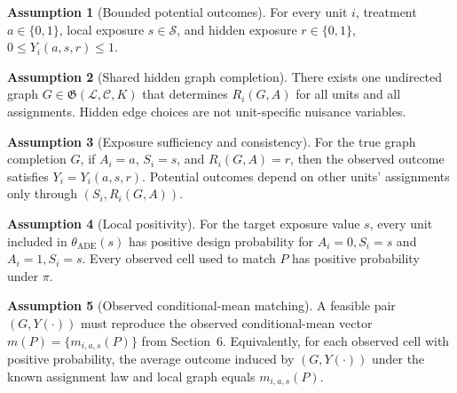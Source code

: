 \documentclass[11pt]{article}
\theoremstyle{definition}
\newtheorem{assumption}{Assumption}
\theoremstyle{plain}
\theoremstyle{remark}
\begin{document}
\begin{assumption}[Bounded potential outcomes]\label{ass:bounded}
For every unit \(i\), treatment \(a\in\{0,1\}\), local exposure \(s\in\mathcal S\), and hidden exposure \(r\in\{0,1\}\), \(0\le Y_i(a,s,r)\le1\).
\end{assumption}

\begin{assumption}[Shared hidden graph completion]\label{ass:shared-completion}
There exists one undirected graph \(G\in\mathfrak G(\mathcal L,\mathcal C,K)\) that determines \(R_i(G,A)\) for all units and all assignments.  Hidden edge choices are not unit-specific nuisance variables.
\end{assumption}

\begin{assumption}[Exposure sufficiency and consistency]\label{ass:exposure-consistency}
For the true graph completion \(G\), if \(A_i=a\), \(S_i=s\), and \(R_i(G,A)=r\), then the observed outcome satisfies \(Y_i=Y_i(a,s,r)\).  Potential outcomes depend on other units' assignments only through \((S_i,R_i(G,A))\).
\end{assumption}

\begin{assumption}[Local positivity]\label{ass:positivity}
For the target exposure value \(s\), every unit included in \(\theta_{\mathrm{ADE}}(s)\) has positive design probability for \(A_i=0,S_i=s\) and \(A_i=1,S_i=s\).  Every observed cell used to match \(P\) has positive probability under \(\pi\).
\end{assumption}

\begin{assumption}[Observed conditional-mean matching]\label{ass:law-matching}
A feasible pair \((G,Y(\cdot))\) must reproduce the observed conditional-mean vector \(m(P)=\{m_{i,a,s}(P)\}\) from Section~6.  Equivalently, for each observed cell with positive probability, the average outcome induced by \((G,Y(\cdot))\) under the known assignment law and local graph equals \(m_{i,a,s}(P)\).
\end{assumption}
\end{document}
